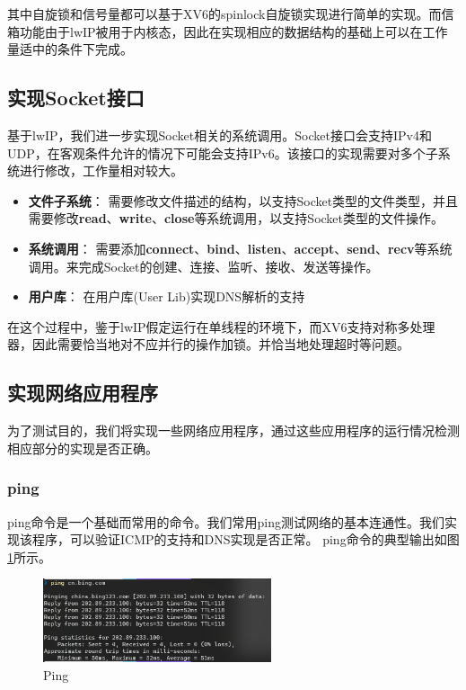 \documentclass[a4paper,twoside]{article}
\begin{document}
\begin{spacing}{1.2}
\begin{table}[htb]
\begin{tabular}{p{4cm}|c}
	\end{tabular}
\end{table}

其中自旋锁和信号量都可以基于XV6的spinlock自旋锁实现进行简单的实现。而信箱功能由于lwIP被用于内核态，因此在实现相应的数据结构的基础上可以在工作量适中的条件下完成。

\subsection{实现Socket接口}

基于lwIP，我们进一步实现Socket相关的系统调用。Socket接口会支持IPv4和UDP，在客观条件允许的情况下可能会支持IPv6。该接口的实现需要对多个子系统进行修改，工作量相对较大。

\begin{itemize}
	\item \textbf{文件子系统}： 需要修改文件描述的结构，以支持Socket类型的文件类型，并且需要修改\textbf{read}、\textbf{write}、\textbf{close}等系统调用，以支持Socket类型的文件操作。
	\item \textbf{系统调用}： 需要添加\textbf{connect}、\textbf{bind}、\textbf{listen}、\textbf{accept}、\textbf{send}、\textbf{recv}等系统调用。来完成Socket的创建、连接、监听、接收、发送等操作。
	\item \textbf{用户库}： 在用户库(User Lib)实现DNS解析的支持
\end{itemize}

在这个过程中，鉴于lwIP假定运行在单线程的环境下，而XV6支持对称多处理器，因此需要恰当地对不应并行的操作加锁。并恰当地处理超时等问题。

\subsection{实现网络应用程序}

为了测试目的，我们将实现一些网络应用程序，通过这些应用程序的运行情况检测相应部分的实现是否正确。

\subsubsection{ping}

ping命令是一个基础而常用的命令。我们常用ping测试网络的基本连通性。我们实现该程序，可以验证ICMP的支持和DNS实现是否正常。
ping命令的典型输出如图\ref{fig:ping}所示。

\begin{figure}[htb]
	\centering
	\caption{Ping}
	\label{fig:ping}
	\includegraphics[width=0.6\textwidth]{ping.png}
\end{figure}


\end{spacing}
\end{document}
